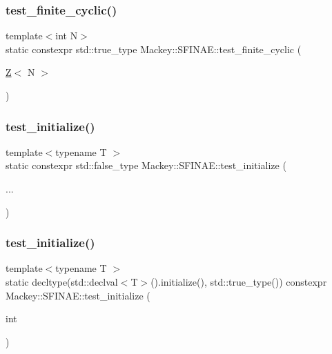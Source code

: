 \subsubsection{\texorpdfstring{test\+\_\+finite\+\_\+cyclic()}{test\_finite\_cyclic()}\hspace{0.1cm}{\footnotesize\ttfamily [2/2]}}
{\footnotesize\ttfamily template$<$int N$>$ \\
static constexpr std\+::true\+\_\+type Mackey\+::\+S\+F\+I\+N\+A\+E\+::test\+\_\+finite\+\_\+cyclic (\begin{DoxyParamCaption}\item[{\hyperlink{classZ}{Z}$<$ N $>$}]{ }\end{DoxyParamCaption})\hspace{0.3cm}{\ttfamily [static]}}

\mbox{\label{structMackey_1_1SFINAE_a1734bf7c631d052255bd1d5f96fb0b21}} 
\subsubsection{\texorpdfstring{test\+\_\+initialize()}{test\_initialize()}\hspace{0.1cm}{\footnotesize\ttfamily [1/2]}}
{\footnotesize\ttfamily template$<$typename T $>$ \\
static constexpr std\+::false\+\_\+type Mackey\+::\+S\+F\+I\+N\+A\+E\+::test\+\_\+initialize (\begin{DoxyParamCaption}\item[{}]{... }\end{DoxyParamCaption})\hspace{0.3cm}{\ttfamily [static]}}

\mbox{\label{structMackey_1_1SFINAE_a70818a71f0e6cead8c7f588600186701}} 
\subsubsection{\texorpdfstring{test\+\_\+initialize()}{test\_initialize()}\hspace{0.1cm}{\footnotesize\ttfamily [2/2]}}
{\footnotesize\ttfamily template$<$typename T $>$ \\
static decltype(std\+::declval$<$T$>$().initialize(), std\+::true\+\_\+type()) constexpr Mackey\+::\+S\+F\+I\+N\+A\+E\+::test\+\_\+initialize (\begin{DoxyParamCaption}\item[{int}]{ }\end{DoxyParamCaption})\hspace{0.3cm}{\ttfamily [static]}}

